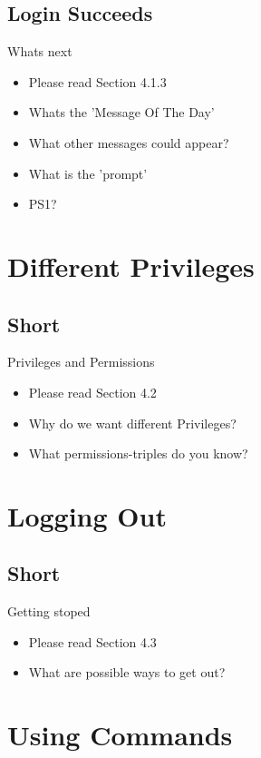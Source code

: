 \documentclass[hyperref={pdfpagelabels=false}]{beamer}
\begin{document}
	\subsection{Login Succeeds}
		\begin{frame}{Whats next}
			\begin{itemize}
				\item<1-> Please read Section 4.1.3
                \item<2-> Whats the 'Message Of The Day'
                \item<3-> What other messages could appear?
                \item<4-> What is the 'prompt'
                \item<5-> PS1?
            \end{itemize}
		\end{frame}
\section{Different Privileges}
    \subsection{Short}
    	\begin{frame}{Privileges and Permissions}
			\begin{itemize}
				\item<1-> Please read Section 4.2
                \item<2-> Why do we want different Privileges?
                \item<3-> What permissions-triples do you know?
            \end{itemize}
		\end{frame}
\section{Logging Out}
    \subsection{Short}
    	\begin{frame}{Getting stoped}
			\begin{itemize}
				\item<1-> Please read Section 4.3
                \item<2-> What are possible ways to get out?
            \end{itemize}
		\end{frame}
\section{Using Commands}
\end{document}
